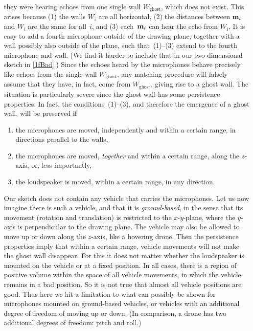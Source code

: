 \documentclass[reqno]{amsart}
\begin{document}
they were hearing echoes from one single wall
$W_{\operatorname{ghost}}$, which does not exist. This arises because
(1) the walls $W_i$ are all horizontal, (2) the distances
between $\mathbf{m}_i$ and $W_i$ are the same for all~$i$, and (3)
each~$\mathbf{m}_i$ can hear the echo from $W_i$. It is easy to add a
fourth microphone outside of the drawing plane, together with a wall
possibly also outside of the plane, such that~(1)--(3) extend to the
fourth microphone and wall. (We find it harder to include that in our
two-dimensional sketch in \cref{1fBad}.) Since the echoes heard by the
microphones behave precisely like echoes from the single wall
$W_{\operatorname{ghost}}$, any matching procedure will falsely assume
that they have, in fact, come from $W_{\operatorname{ghost}}$, giving
rise to a ghost wall.
The situation is particularly severe since the ghost wall has some
persistence properties. In fact, the conditions~(1)--(3), and
therefore the emergence of a ghost wall, will be preserved if
\begin{enumerate}[label=(\alph*)]
\item \label{PerA} the microphones are moved, independently and within a certain
  range, in directions parallel to the walls,
\item \label{PerB} the microphones are moved, {\em together} and within a certain
  range, along the $z$-axis, or, less importantly,
\item \label{PerC} the loudspeaker is moved, within a certain range, in any
  direction.
\end{enumerate}

Our sketch does not contain any vehicle that carries the
microphones. Let us now imagine there is such a vehicle, and that it
is {\em ground-based}, in the sense that its movement (rotation and
translation) is restricted to the $x$-$y$-plane, where the $y$-axis is
perpendicular to the drawing plane. The vehicle may also be allowed to
move up or down along the $z$-axis, like a hovering drone. Then the
persistence properties imply that within a certain range, vehicle
movements will not make the ghost wall disappear. For this it does not
matter whether the loudspeaker is mounted on the vehicle or at a fixed
position. In all cases, there is a region of positive volume within
the space of all vehicle movements, in which the vehicle remains in a
bad position. So it is not true that almost all vehicle positions are good. Thus
here we hit a limitation to what can possibly be shown for microphones
mounted on ground-based vehicles, or vehicles with an additional
degree of freedom of moving up or down. (In comparison, a drone has
two additional degrees of freedom: pitch and roll.)
\end{document}
